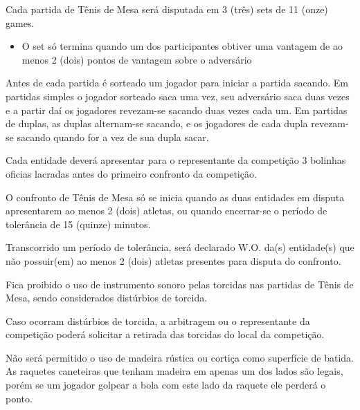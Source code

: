 \noindent
Cada partida de Tênis de Mesa será disputada em 3 (três) sets de 11 (onze) games.
\begin{itemize}[noitemsep]
	\item O set só termina quando um dos participantes obtiver uma vantagem de ao menos 2 (dois) pontos de vantagem sobre o adversário
\end{itemize}

\noindent
Antes de cada partida é sorteado um jogador para iniciar a partida sacando. Em partidas simples o jogador sorteado saca uma vez, seu adversário saca duas vezes e a partir daí os jogadores revezam-se sacando duas vezes cada um. Em partidas de duplas, as duplas alternam-se sacando, e os jogadores de cada dupla revezam-se sacando quando for a vez de sua dupla sacar.

\begin{article}
	Cada entidade deverá apresentar para o representante da competição 3 bolinhas oficias lacradas antes do primeiro confronto da competição.
\end{article}

\begin{article}
	O confronto de Tênis de Mesa só se inicia quando as duas entidades em disputa apresentarem ao menos 2 (dois) atletas, ou quando encerrar-se o período de tolerância de 15 (quinze) minutos.

	\begin{xparagraph}
		Transcorrido um período de tolerância, será declarado W.O. da(s) entidade(s) que não possuir(em) ao menos 2 (dois) atletas presentes para disputa do confronto.
	\end{xparagraph}
\end{article}

\begin{article}
	Fica proibido o uso de instrumento sonoro pelas torcidas nas partidas de Tênis de Mesa, sendo considerados distúrbios de torcida.

	\begin{xparagraph}
		Caso ocorram distúrbios de torcida, a arbitragem ou o representante da competição poderá solicitar a retirada das torcidas do local da competição.
	\end{xparagraph}
\end{article}

\begin{article}
	Não será permitido o uso de madeira rústica ou cortiça como superfície de batida. As raquetes caneteiras que tenham madeira em apenas um dos lados são legais, porém se um jogador golpear a bola com este lado da raquete ele perderá o ponto.
\end{article}
